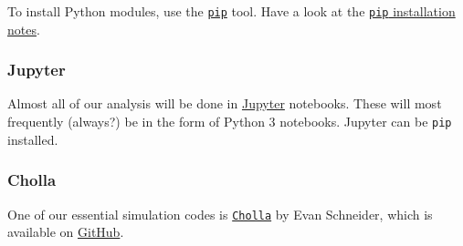 \noindent
To install Python modules, use the \href{https://pypi.org/project/pip/}{\tt pip} tool. Have a look at the \href{https://pip.pypa.io/en/stable/installing/}{{\tt pip} installation notes}.

\subsubsection{Jupyter}
\label{sec:jupyter}

Almost all of our analysis will be done in \href{https://jupyter.org/}{Jupyter} notebooks. These will most frequently (always?) be in the form of Python 3 notebooks. Jupyter can be {\tt pip} installed.

\subsubsection{Cholla}
\label{sec:cholla}

One of our essential simulation codes is \href{https://github.com/cholla-hydro/cholla}{{\tt Cholla}} by Evan Schneider, which is available on \href{https://github.com}{GitHub}.

